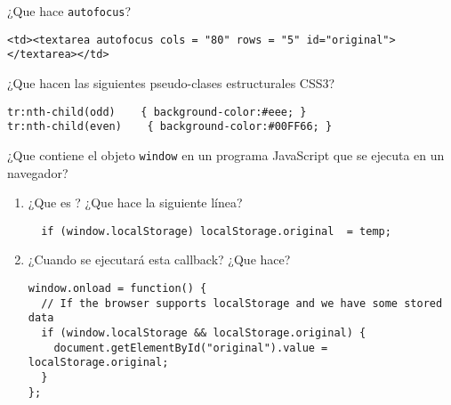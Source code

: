 \item  ¿Que hace \verb|autofocus|?
\begin{verbatim}
<td><textarea autofocus cols = "80" rows = "5" id="original"></textarea></td> 
\end{verbatim}
\item  ¿Que hacen las siguientes pseudo-clases estructurales CSS3?
\begin{verbatim}
tr:nth-child(odd)    { background-color:#eee; }
tr:nth-child(even)    { background-color:#00FF66; }
\end{verbatim}
\item ¿Que contiene el objeto \verb|window| en un programa JavaScript que se ejecuta en un navegador?

\item 
\begin{enumerate}
\item 
¿Que es ? ¿Que hace la siguiente línea?
\begin{verbatim}
  if (window.localStorage) localStorage.original  = temp;
\end{verbatim}
\item  ¿Cuando se ejecutará esta callback? ¿Que hace?
\begin{verbatim}
window.onload = function() {
  // If the browser supports localStorage and we have some stored data
  if (window.localStorage && localStorage.original) {
    document.getElementById("original").value = localStorage.original;
  }
};
\end{verbatim}
\end{enumerate}

